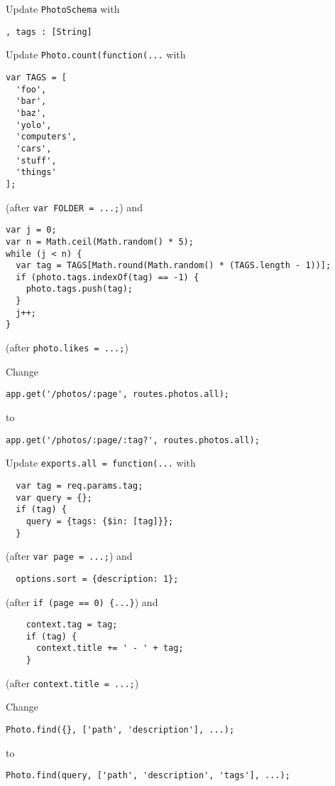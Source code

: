 \documentclass{article}
\begin{document}
Update \verb!PhotoSchema! with
\begin{verbatim}
, tags : [String]
\end{verbatim}

Update \verb!Photo.count(function(...! with 
\begin{verbatim}
var TAGS = [
  'foo',
  'bar',
  'baz',
  'yolo',
  'computers',
  'cars',
  'stuff',
  'things'
];
\end{verbatim}
(after \verb!var FOLDER = ...;!)
and
\begin{verbatim}
var j = 0;
var n = Math.ceil(Math.random() * 5);
while (j < n) {
  var tag = TAGS[Math.round(Math.random() * (TAGS.length - 1))];
  if (photo.tags.indexOf(tag) == -1) {
    photo.tags.push(tag);
  }
  j++;
}
\end{verbatim}
(after \verb!photo.likes = ...;!)


Change
\begin{verbatim}
app.get('/photos/:page', routes.photos.all);
\end{verbatim}
to
\begin{verbatim}
app.get('/photos/:page/:tag?', routes.photos.all);
\end{verbatim}


Update \verb!exports.all = function(...! with
\begin{verbatim}
  var tag = req.params.tag;
  var query = {};
  if (tag) {
    query = {tags: {$in: [tag]}};
  }
\end{verbatim}
(after \verb!var page = ...;!)
and
\begin{verbatim}
  options.sort = {description: 1};
\end{verbatim}
(after \verb!if (page == 0) {...}!)
and
\begin{verbatim}
    context.tag = tag;
    if (tag) {
      context.title += ' - ' + tag;
    }
\end{verbatim}
(after \verb!context.title = ...;!)

Change
\begin{verbatim}
Photo.find({}, ['path', 'description'], ...);
\end{verbatim}
to
\begin{verbatim}
Photo.find(query, ['path', 'description', 'tags'], ...);
\end{verbatim}

\end{document}
